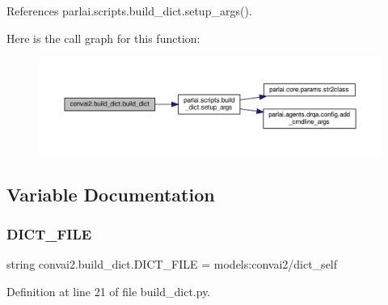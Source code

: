 References parlai.\+scripts.\+build\+\_\+dict.\+setup\+\_\+args().

Here is the call graph for this function\+:
\nopagebreak
\begin{figure}[H]
\begin{center}
\leavevmode
\includegraphics[width=350pt]{namespaceconvai2_1_1build__dict_a2c927edbaf6ce4c2451ceb21e8f822e7_cgraph}
\end{center}
\end{figure}


\subsection{Variable Documentation}
\mbox{\label{namespaceconvai2_1_1build__dict_ab60da44aada182642c6a9d8d273479d3}} 
\subsubsection{\texorpdfstring{D\+I\+C\+T\+\_\+\+F\+I\+LE}{DICT\_FILE}}
{\footnotesize\ttfamily string convai2.\+build\+\_\+dict.\+D\+I\+C\+T\+\_\+\+F\+I\+LE = \textquotesingle{}models\+:convai2/dict\+\_\+self\textquotesingle{}}



Definition at line 21 of file build\+\_\+dict.\+py.

